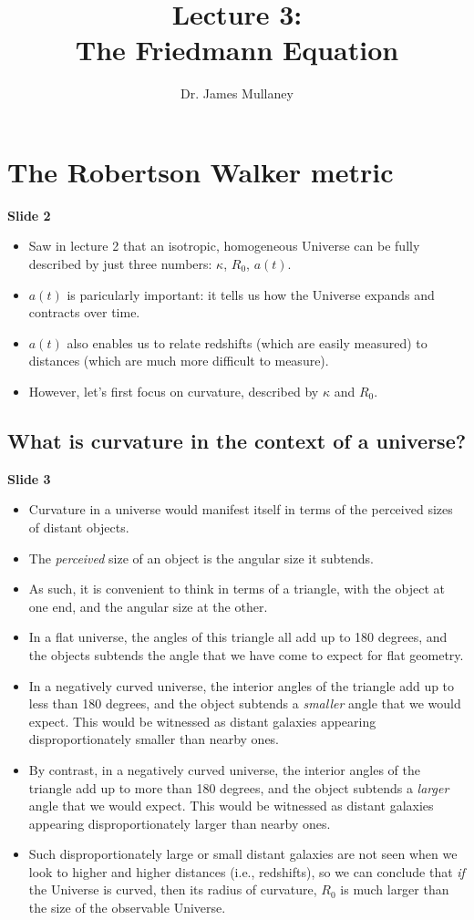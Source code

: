 \documentclass[11pt]{article}
\begin{document}
 
\title{Lecture 3:\\The Friedmann Equation}
\author{Dr. James Mullaney}
\maketitle

\section{The Robertson Walker metric}
{\bf Slide 2}
\begin{itemize}
\item Saw in lecture 2 that an isotropic, homogeneous Universe can be fully described by just three numbers: $\kappa$, $R_0$, $a(t)$.
\item $a(t)$ is paricularly important: it tells us how the Universe expands and contracts over time.
\item $a(t)$ also enables us to relate redshifts (which are easily measured) to distances (which are much more difficult to measure).
\item However, let's first focus on curvature, described by $\kappa$ and $R_0$.
\end{itemize}
\subsection{What is curvature in the context of a universe?}
{\bf Slide 3}
\begin{itemize}
\item Curvature in a universe would manifest itself in terms of the perceived sizes of distant objects.
\item The {\it perceived} size of an object is the angular size it subtends.
\item As such, it is convenient to think in terms of a triangle, with the object at one end, and the angular size at the other.
\item In a flat universe, the angles of this triangle all add up to 180 degrees, and the objects subtends the angle that we have come to expect for flat geometry.
\item In a negatively curved universe, the interior angles of the triangle add up to less than 180 degrees, and the object subtends a {\it smaller} angle that we would expect. This would be witnessed as distant galaxies appearing disproportionately smaller than nearby ones.
\item By contrast, in a negatively curved universe, the interior angles of the triangle add up to more than 180 degrees, and the object subtends a {\it larger} angle that we would expect. This would be witnessed as distant galaxies appearing disproportionately larger than nearby ones.
\item Such disproportionately large or small distant galaxies are not seen when we look to higher and higher distances (i.e., redshifts), so we can conclude that {\it if} the Universe is curved, then its radius of curvature, $R_0$ is much larger than the size of the observable Universe.

\end{itemize}
\end{document}
